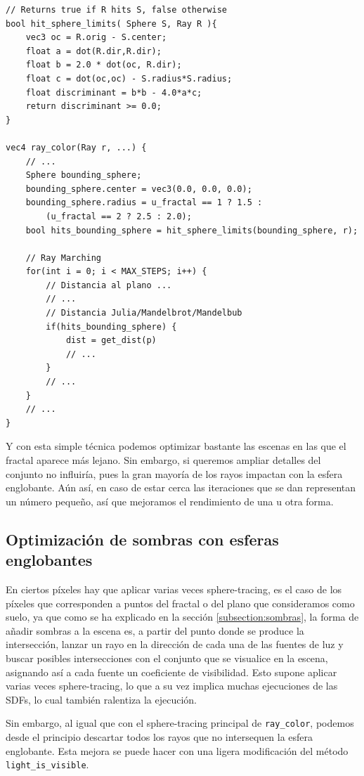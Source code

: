\begin{lstlisting}
// Returns true if R hits S, false otherwise
bool hit_sphere_limits( Sphere S, Ray R ){
    vec3 oc = R.orig - S.center;
    float a = dot(R.dir,R.dir);
    float b = 2.0 * dot(oc, R.dir);
	float c = dot(oc,oc) - S.radius*S.radius;
    float discriminant = b*b - 4.0*a*c;
    return discriminant >= 0.0;
}

vec4 ray_color(Ray r, ...) {
    // ... 
    Sphere bounding_sphere;
    bounding_sphere.center = vec3(0.0, 0.0, 0.0);
    bounding_sphere.radius = u_fractal == 1 ? 1.5 : 
        (u_fractal == 2 ? 2.5 : 2.0);
    bool hits_bounding_sphere = hit_sphere_limits(bounding_sphere, r);
    
    // Ray Marching
    for(int i = 0; i < MAX_STEPS; i++) {
        // Distancia al plano ... 
        // ... 
        // Distancia Julia/Mandelbrot/Mandelbub
        if(hits_bounding_sphere) {
            dist = get_dist(p)
            // ... 
        }
        // ... 
    }
    // ...
}
\end{lstlisting}

Y con esta simple técnica podemos optimizar bastante las escenas en las que el fractal aparece más lejano. Sin embargo, si queremos ampliar detalles del conjunto no influiría, pues la gran mayoría de los rayos impactan con la esfera englobante. Aún así, en caso de estar cerca las iteraciones que se dan representan un número pequeño, así que mejoramos el rendimiento de una u otra forma.

\subsection{Optimización de sombras con esferas englobantes}

En ciertos píxeles hay que aplicar varias veces sphere-tracing, es el caso de los píxeles que corresponden a puntos del fractal o del plano que consideramos como suelo, ya que como se ha explicado en la sección \ref{subsection:sombras}, la forma de añadir sombras a la escena es, a partir del punto donde se produce la intersección, lanzar un rayo en la dirección de cada una de las fuentes de luz y buscar posibles intersecciones con el conjunto que se visualice en la escena, asignando así a cada fuente un coeficiente de visibilidad. Esto supone aplicar varias veces sphere-tracing, lo que a su vez implica muchas ejecuciones de las SDFs, lo cual también ralentiza la ejecución. 

Sin embargo, al igual que con el sphere-tracing principal de \verb|ray_color|, podemos desde el principio descartar todos los rayos que no intersequen la esfera englobante. Esta mejora se puede hacer con una ligera modificación del método \verb|light_is_visible|.

